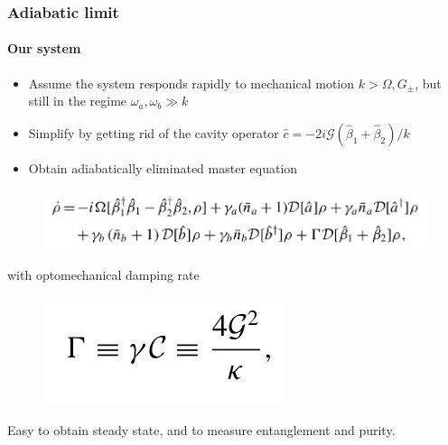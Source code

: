 \documentclass[aspectratio=43]{beamer}
\begin{document}
\begin{frame}
	
	\frametitle{Adiabatic limit}
	\framesubtitle{Our system}
	
	\begin{itemize}
		\item Assume the system responds rapidly to mechanical motion $k > \Omega, G_{\pm}$, but still in the regime $\omega_{a}, \omega_{b} \gg k$
		\item Simplify by getting rid of the cavity operator $\hat{c} = -2i\mathcal{G}(\hat{\beta}_{1} + \hat{\beta}_{2})/k$\\
		\item Obtain adiabatically eliminated master equation
	\end{itemize}

	\begin{figure}
		\includegraphics[width = 9 cm]{plots/master_eq_2.png}
	\end{figure}

	with optomechanical damping rate
	\begin{figure}
		\includegraphics[width = 3 cm]{plots/optomechanic_dumping.png}
	\end{figure}

	Easy to obtain steady state, and to measure entanglement and purity.
	 
\end{frame}
\end{document}
